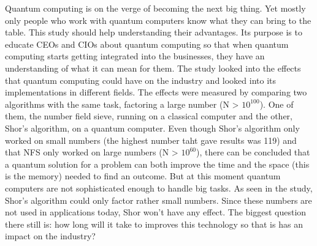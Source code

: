 Quantum computing is on the verge of becoming the next big thing. Yet mostly only people who work with quantum computers know what they can bring to the table.
This study should help understanding their advantages.
Its purpose is to educate CEOs and CIOs about quantum computing so that when quantum computing starts getting integrated into the businesses, they have an understanding of what it can mean for them.
The study looked into the effects that quantum computing could have on the industry and looked into its implementations in different fields.
The effects were measured by comparing two algorithms with the same task, factoring a large number (N > $10^{100}$). One of them, the number field sieve, running on a classical computer and the other, Shor's algorithm, on a quantum computer.
Even though Shor's algorithm only worked on small numbers (the highest number taht gave results was 119) and that NFS only worked on large numbers (N > $10^{60}$), there can be concluded that a quantum solution for a problem can both improve the time and the space (this is the memory) needed to find an outcome.
But at this moment quantum computers are not sophisticated enough to handle big tasks. As seen in the study, Shor's algorithm could only factor rather small numbers. Since these numbers are not used in applications today, Shor won't have any effect.
The biggest question there still is: how long will it take to improves this technology so that is has an impact on the industry?
